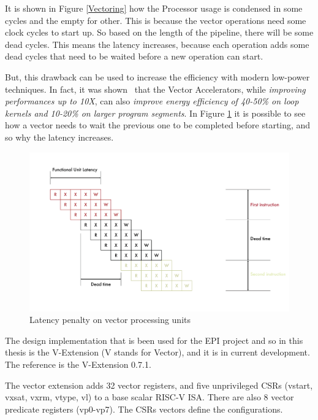 It is shown in Figure \ref{Vectoring} how the Processor usage is condensed in some cycles and the empty for other. This is because the vector operations need some clock cycles to start up. So based on the length of the pipeline, there will be some dead cycles.
This means the latency increases, because each operation adds some dead cycles that need to be waited before a new operation can start.

But, this drawback can be used to increase the efficiency with modern low-power techniques. In fact, it was shown~\cite{Lemuet2006} that the Vector Accelerators, while \emph{improving performances up to 10X}, can also \emph{improve energy efficiency of 40-50\% on loop kernels and 10-20\% on larger program segments}.
In Figure \ref{Vector-Latency} it is possible to see how a vector needs to wait the previous one to be completed before starting, and so why the latency increases. 

\begin{figure}[H]
    \centering
    \includegraphics[scale = 0.5]{Chapter_1/img/lat-pen.png}
    \caption{Latency penalty on vector processing units \cite{L15-Krste}}
    \label{Vector-Latency}
\end{figure}


The design implementation that is been used for the EPI project and so in this thesis is the V-Extension (V stands for Vector), and it is in current development. The reference is the V-Extension 0.7.1.

The vector extension adds 32 vector registers, and five unprivileged CSRs (vstart, vxsat, vxrm, vtype, vl) to a base scalar RISC-V ISA\cite{riscv-v-specs}.
There are also 8 vector predicate registers (vp0-vp7). The CSRs vectors define the configurations.

